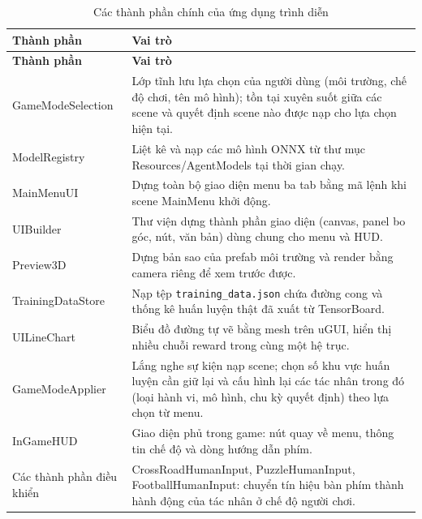 \begingroup
\renewcommand{\arraystretch}{1.35}
\tablefont
\begin{longtable}{|p{4.4cm}|>{\raggedright\arraybackslash}p{9.1cm}|}
\caption{Các thành phần chính của ứng dụng trình diễn}
\label{tab:app_modules} \\
\hline
\textbf{Thành phần} & \textbf{Vai trò} \\
\hline
\endfirsthead
\hline
\textbf{Thành phần} & \textbf{Vai trò} \\
\hline
\endhead
\endfoot
GameModeSelection & Lớp tĩnh lưu lựa chọn của người dùng (môi trường, chế độ
chơi, tên mô hình); tồn tại xuyên suốt giữa các scene và quyết định scene nào
được nạp cho lựa chọn hiện tại. \\
\hline
ModelRegistry & Liệt kê và nạp các mô hình ONNX từ thư mục
Resources/AgentModels tại thời gian chạy. \\
\hline
MainMenuUI & Dựng toàn bộ giao diện menu ba tab bằng mã lệnh khi scene
MainMenu khởi động. \\
\hline
UIBuilder & Thư viện dựng thành phần giao diện (canvas, panel bo góc, nút,
văn bản) dùng chung cho menu và HUD. \\
\hline
Preview3D & Dựng bản sao của prefab môi trường và render
bằng camera riêng để xem trước được. \\
\hline
TrainingDataStore & Nạp tệp \texttt{training\_data.json} chứa đường cong và
thống kê huấn luyện thật đã xuất từ TensorBoard. \\
\hline
UILineChart & Biểu đồ đường tự vẽ bằng mesh trên uGUI, hiển thị nhiều chuỗi
reward trong cùng một hệ trục. \\
\hline
GameModeApplier & Lắng nghe sự kiện nạp scene; chọn số khu vực huấn luyện cần
giữ lại và cấu hình lại các tác nhân trong đó (loại hành vi, mô hình, chu kỳ quyết
định) theo lựa chọn từ menu. \\
\hline
InGameHUD & Giao diện phủ trong game: nút quay về menu, thông tin chế độ và
dòng hướng dẫn phím. \\
\hline
Các thành phần điều khiển & CrossRoadHumanInput, PuzzleHumanInput,
FootballHumanInput: chuyển tín hiệu bàn phím thành hành động của tác nhân
ở chế độ người chơi. \\
\hline
\end{longtable}
\endgroup

